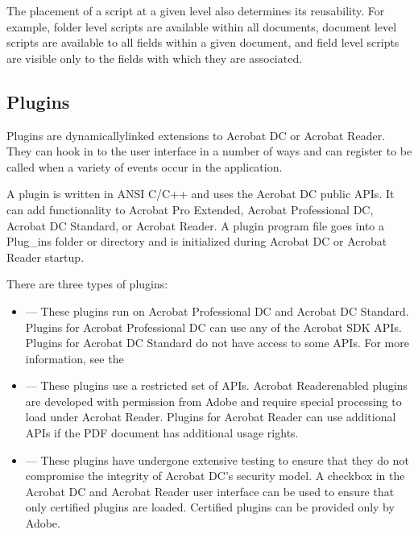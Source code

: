 \documentclass[letterpaper,12pt,english,openany,oneside]{sphinxmanual}
\begin{document}
The placement of a script at a given level also determines its reusability. For example, folder level scripts are available within all documents, document level scripts are available to all fields within a given document, and field level scripts are visible only to the fields with which they are associated.




\subsection{Plug\sphinxhyphen{}ins}
\label{\detokenize{index:plug-ins}}
Plug\sphinxhyphen{}ins are dynamically\sphinxhyphen{}linked extensions to Acrobat DC or Acrobat Reader. They can hook in to the user interface in a number of ways and can register to be called when a variety of events occur in the application.

A plug\sphinxhyphen{}in is written in ANSI C/C++ and uses the Acrobat DC public APIs. It can add functionality to Acrobat Pro Extended, Acrobat Professional DC, Acrobat DC Standard, or Acrobat Reader. A plug\sphinxhyphen{}in program file goes into a Plug\_ins folder or directory and is initialized during Acrobat DC or Acrobat Reader startup.

There are three types of plug\sphinxhyphen{}ins:
\begin{itemize}
\item {} 
 — These plug\sphinxhyphen{}ins run on Acrobat Professional DC and Acrobat DC Standard. Plug\sphinxhyphen{}ins for Acrobat Professional DC can use any of the Acrobat SDK APIs. Plug\sphinxhyphen{}ins for Acrobat DC Standard do not have access to some APIs. For more information, see the 

\item {} 
 — These plug\sphinxhyphen{}ins use a restricted set of APIs. Acrobat Reader\sphinxhyphen{}enabled plug\sphinxhyphen{}ins are developed with permission from Adobe and require special processing to load under Acrobat Reader. Plug\sphinxhyphen{}ins for Acrobat Reader can use additional APIs if the PDF document has additional usage rights.

\item {} 
 — These plug\sphinxhyphen{}ins have undergone extensive testing to ensure that they do not compromise the integrity of Acrobat DC’s security model. A checkbox in the Acrobat DC and Acrobat Reader user interface can be used to ensure that only certified plug\sphinxhyphen{}ins are loaded. Certified plug\sphinxhyphen{}ins can be provided only by Adobe.

\end{itemize}
\end{document}
